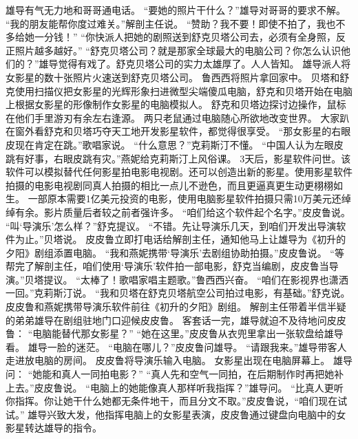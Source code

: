 \documentclass[a4paper,12pt,UTF8,twoside]{ctexbook}
\begin{document}
        雄导有气无力地和哥哥通电话。  
        “要她的照片干什么？”雄导对哥哥的要求不解。  
        “我的朋友能帮你度过难关。”解剖主任说。  
        “赞助？我不要！即使不拍了，我也不多给她一分钱！”  
        “你快派人把她的剧照送到舒克贝塔公司去，必须有全身照，反正照片越多越好。”  
        “舒克贝塔公司？就是那家全球最大的电脑公司？你怎么认识他们的？”雄导觉得有戏了。舒克贝塔公司的实力太雄厚了。人人皆知。  
        雄导派人将女影星的数十张照片火速送到舒克贝塔公司。  
        鲁西西将照片拿回家中。  
        贝塔和舒克使用扫描仪把女影星的光辉形象扫进微型尖端傻瓜电脑，舒克和贝塔开始在电脑上根据女影星的形像制作女影星的电脑模拟人。  
        舒克和贝塔边探讨边操作，鼠标在他们手里游刃有余左右逢源。  
        两只老鼠通过电脑随心所欲地改变世界。  
        大家趴在窗外看舒克和贝塔巧夺天工地开发影星软件，都觉得很享受。  
        “那女影星的右眼皮现在肯定在跳。”歌唱家说。  
        “什么意思？”克莉斯汀不懂。  
        “中国人认为左眼皮跳有好事，右眼皮跳有灾。”燕妮给克莉斯汀上风俗课。  
        3天后，影星软件问世。该软件可以模拟替代任何影星拍电影电视剧。还可以创造出新的影星。使用影星软件拍摄的电影电视剧同真人拍摄的相比一点儿不逊色，而且更逼真更生动更栩栩如生。  
        一部原本需要1亿美元投资的电影，使用电脑影星软件拍摄只需10万美元还绰绰有余。影片质量后者较之前者强许多。  
        “咱们给这个软件起个名字。”皮皮鲁说。  
        “叫‘导演乐’怎么样？”舒克提议。  
        “不错。先让导演乐几天，到咱们开发出导演软件为止。”贝塔说。  
        皮皮鲁立即打电话给解剖主任，通知他马上让雄导为《初升的夕阳》剧组添置电脑。  
        “我和燕妮携带‘导演乐’去剧组协助拍摄。”皮皮鲁说。  
        “等帮完了解剖主任，咱们使用‘导演乐’软件拍一部电影，舒克当编剧，皮皮鲁当导演。”贝塔提议。  
        “太棒了！歌唱家唱主题歌。”鲁西西兴奋。  
        “咱们在影视界也潇洒一回。”克莉斯汀说。  
        “我和贝塔在舒克贝塔航空公司拍过电影，有基础。”舒克说。  
        皮皮鲁和燕妮携带导演乐软件前往《初升的夕阳》剧组。  
        解剖主任带着半信半疑的弟弟雄导在剧组驻地门口迎候皮皮鲁。  
        客套话一完，雄导就迫不及待地问皮皮鲁：  
        “电脑能替代那女影星？”  
        “她在这里。”皮皮鲁从衣兜里拿出一张软盘给雄导看。  
        雄导一脸的迷茫。  
        “电脑在哪儿？”皮皮鲁问雄导。  
        “请跟我来。”雄导带客人走进放电脑的房间。  
        皮皮鲁将导演乐输入电脑。  
        女影星出现在电脑屏幕上。  
        雄导问：  
        “她能和真人一同拍电影？”  
        “真人先和空气一同拍，在后期制作时再把她补上去。”皮皮鲁说。  
        “电脑上的她能像真人那样听我指挥？”雄导问。  
        “比真人更听你指挥。你让她干什么她都无条件地干，而且分文不取。”皮皮鲁说，“咱们现在试试。”  
        雄导兴致大发，他指挥电脑上的女影星表演，皮皮鲁通过键盘向电脑中的女影星转达雄导的指令。  
\end{document}
